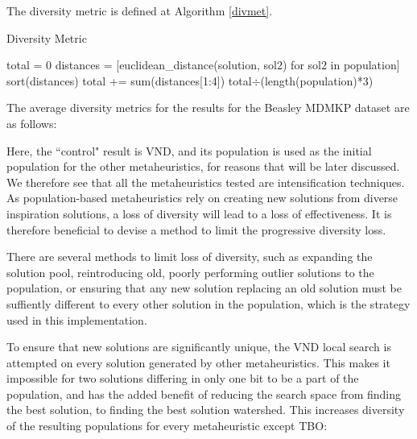 \documentclass[11pt, letterpaper, onecolumn]{article}
\begin{document}
The diversity metric is defined at Algorithm \ref{divmet}. 



\begin{algorithm}
\caption{Diversity Metric}
\label{divmet}
\begin{algorithmic}
\STATE total = 0
\STATE distances = [euclidean\_distance(solution, sol2) for sol2 in population]
\STATE sort(distances)
\STATE total += sum(distances[1:4])
\ENDFOR
\RETURN total$\div$(length(population)*3)
\end{algorithmic}
\end{algorithm}

\clearpage
The average diversity metrics for the results for the Beasley MDMKP dataset are as follows:


\begin{table}[htbp]
\end{table}

Here, the ``control" result is VND, and its population is used as the initial population for the other metaheuristics, for reasons that will be later discussed. We therefore see that all the metaheuristics tested are intensification techniques. As population-based metaheuristics rely on creating new solutions from diverse inspiration solutions, a loss of diversity will lead to a loss of effectiveness. It is therefore beneficial to devise a method to limit the progressive diversity loss. 

There are several methods to limit loss of diversity, such as expanding the solution pool, reintroducing old, poorly performing outlier solutions to the population, or ensuring that any new solution replacing an old solution must be suffiently different to every other solution in the population, which is the strategy used in this implementation. 

To ensure that new solutions are significantly unique, the VND local search is attempted on every solution generated by other metaheuristics. This makes it impossible for two solutions differing in only one bit to be a part of the population, and has the added benefit of reducing the search space from finding the best solution, to finding the best solution watershed. This increases diversity of the resulting populations for every metaheuristic except TBO:
\end{document}
